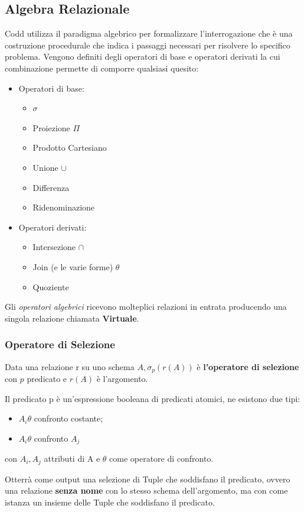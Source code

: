 \documentclass[10pt,twocolumn]{article}
\begin{document}
\subsection{Algebra Relazionale}
Codd utilizza il paradigma algebrico per formalizzare l'interrogazione che è una costruzione procedurale che indica i passaggi necessari per risolvere lo specifico problema. Vengono definiti degli operatori di base e operatori derivati la cui combinazione permette di comporre qualsiasi quesito:\begin{itemize}
    \item Operatori di base:\begin{itemize}
        \item $\sigma$
        \item Proiezione $\Pi$
        \item Prodotto Cartesiano
        \item Unione $\cup$
        \item Differenza 
        \item Ridenominazione 
    \end{itemize}
    \item Operatori derivati: \begin{itemize}
        \item Intersezione $\cap$
        \item Join (e le varie forme) $\theta$
        \item Quoziente
    \end{itemize}
\end{itemize}
Gli \textit{operatori algebrici} ricevono molteplici relazioni in entrata producendo una singola relazione chiamata \textbf{Virtuale}.
\subsubsection{Operatore di Selezione}
Data una relazione r su uno schema $A,\sigma_p(r(A))$ è \textbf{l'operatore di selezione} con $p$ predicato e $r(A)$ è l'argomento.

Il predicato p è un'espressione booleana di predicati atomici, ne esistono due tipi: \begin{itemize}
    \item $A_i \theta$ confronto costante;
    \item $A_i \theta$ confronto $A_j$
\end{itemize}
con $A_i,A_j$ attributi di A e $\theta$ come operatore di confronto.

Otterrà come output una selezione di Tuple che soddisfano il predicato, ovvero una relazione \textbf{senza nome} con lo stesso schema dell'argomento, ma con come istanza un insieme delle Tuple che soddisfano il predicato.
\end{document}
